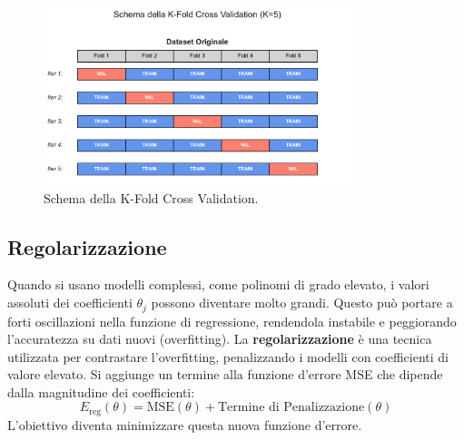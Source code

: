 \documentclass{article}
\begin{document}
\begin{figure}[H]
    \centering
    \includegraphics[width=0.8\textwidth]{images/k_fold_cross_validation.pdf}
    \caption{Schema della K-Fold Cross Validation.}
    \label{fig:k_fold_cv}
\end{figure}

\subsection{Regolarizzazione}
Quando si usano modelli complessi, come polinomi di grado elevato, i valori assoluti dei coefficienti $\theta_j$ possono diventare molto grandi. Questo può portare a forti oscillazioni nella funzione di regressione, rendendola instabile e peggiorando l'accuratezza su dati nuovi (overfitting).
La \textbf{regolarizzazione} è una tecnica utilizzata per contrastare l'overfitting, penalizzando i modelli con coefficienti di valore elevato. Si aggiunge un termine alla funzione d'errore MSE che dipende dalla magnitudine dei coefficienti:
$$ E_{\text{reg}}(\theta) = \text{MSE}(\theta) + \text{Termine di Penalizzazione}(\theta) $$
L'obiettivo diventa minimizzare questa nuova funzione d'errore.
\end{document}
